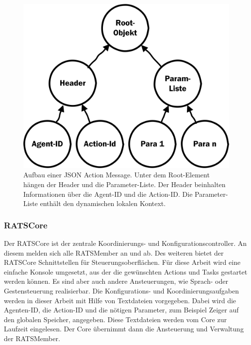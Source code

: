 \begin{figure}
	\centering
	\includegraphics[scale=0.5]{fig/jsonmsg}
	\caption[JSON Action Message]{Aufbau einer JSON Action Message. Unter dem Root-Element hängen der Header und die Parameter-Liste. Der Header beinhalten Informationen über die Agent-ID und die Action-ID. Die Parameter-Liste enthält den dynamischen lokalen Kontext.}
	\label{fig:jsonmsg}
\end{figure}

\subsubsection{RATSCore}
Der RATSCore ist der zentrale Koordinierungs- und Konfigurationscontroller. An diesem melden sich alle RATSMember an und ab. Des weiteren bietet der RATSCore Schnittstellen für Steuerungsoberflächen. Für diese Arbeit wird eine einfache Konsole umgesetzt, aus der die gewünschten Actions und Tasks  gestartet werden können. Es sind aber auch andere Ansteuerungen, wie Sprach- oder Gestensteuerung realisierbar. Die Konfigurations- und Koordinierungsaufgaben werden in dieser Arbeit mit Hilfe von Textdateien vorgegeben. Dabei wird die Agenten-ID, die Action-ID und die nötigen Parameter, zum Beispiel Zeiger auf den globalen Speicher, angegeben. Diese Textdateien werden vom Core zur Laufzeit eingelesen. Der Core übernimmt dann die Ansteuerung und Verwaltung der RATSMember.

